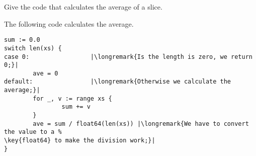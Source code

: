\begin{Exercise}[title={Average},difficulty=4]
\label{ex:average no func}
\Question\label{ex:average no func q1} Give the code
that calculates the average of a  slice.
\end{Exercise}

\begin{Answer}
\Question The following code calculates the average.
\begin{lstlisting}
sum := 0.0 
switch len(xs) {
case 0:                 |\longremark{Is the length is zero, we return 0;}|
        ave = 0
default:                |\longremark{Otherwise we calculate the average;}|
        for _, v := range xs {
                sum += v
        }
        ave = sum / float64(len(xs)) |\longremark{We have to convert the value to a %
\key{float64} to make the division work;}|
}
\end{lstlisting}
\showremarks
\end{Answer}
